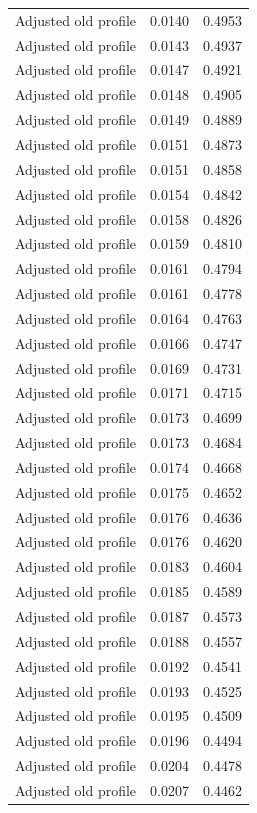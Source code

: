\begin{table}[htbp]
\begin{tabular}{lll}
Adjusted old profile & 0.0140 & 0.4953 \\
Adjusted old profile & 0.0143 & 0.4937 \\
Adjusted old profile & 0.0147 & 0.4921 \\
Adjusted old profile & 0.0148 & 0.4905 \\
Adjusted old profile & 0.0149 & 0.4889 \\
Adjusted old profile & 0.0151 & 0.4873 \\
Adjusted old profile & 0.0151 & 0.4858 \\
Adjusted old profile & 0.0154 & 0.4842 \\
Adjusted old profile & 0.0158 & 0.4826 \\
Adjusted old profile & 0.0159 & 0.4810 \\
Adjusted old profile & 0.0161 & 0.4794 \\
Adjusted old profile & 0.0161 & 0.4778 \\
Adjusted old profile & 0.0164 & 0.4763 \\
Adjusted old profile & 0.0166 & 0.4747 \\
Adjusted old profile & 0.0169 & 0.4731 \\
Adjusted old profile & 0.0171 & 0.4715 \\
Adjusted old profile & 0.0173 & 0.4699 \\
Adjusted old profile & 0.0173 & 0.4684 \\
Adjusted old profile & 0.0174 & 0.4668 \\
Adjusted old profile & 0.0175 & 0.4652 \\
Adjusted old profile & 0.0176 & 0.4636 \\
Adjusted old profile & 0.0176 & 0.4620 \\
Adjusted old profile & 0.0183 & 0.4604 \\
Adjusted old profile & 0.0185 & 0.4589 \\
Adjusted old profile & 0.0187 & 0.4573 \\
Adjusted old profile & 0.0188 & 0.4557 \\
Adjusted old profile & 0.0192 & 0.4541 \\
Adjusted old profile & 0.0193 & 0.4525 \\
Adjusted old profile & 0.0195 & 0.4509 \\
Adjusted old profile & 0.0196 & 0.4494 \\
Adjusted old profile & 0.0204 & 0.4478 \\
Adjusted old profile & 0.0207 & 0.4462 \\

\end{tabular}
\end{table}
